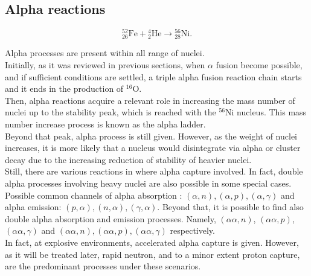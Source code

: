 \documentclass[openany]{book}
\begin{document}
\subsection{Alpha reactions} \label{sub:alphaProcesses}

\begin{equation}  \label{eq:reaction_52Fealpha}
	\mathrm{{}^{52}_{26}Fe +{}^{4}_{2}He \rightarrow {}^{56}_{28}Ni}.
\end{equation}

Alpha processes are present within all range of nuclei. \\

Initially, as it was reviewed in previous sections, when $\alpha$ fusion become possible, and if sufficient conditions are settled, a triple alpha fusion reaction chain starts and it ends in the production of $\mathrm{{}^{16}O}$.  \\

Then, alpha reactions acquire a relevant role in increasing the mass number of nuclei up to the stability peak, which is reached with the $\mathrm{{}^{56}Ni}$ nucleus. This mass number increase process is known as the alpha ladder.  \\

Beyond that peak, alpha process is still given. However, as the weight of nuclei increases, it is more likely that a nucleus would disintegrate via alpha or cluster decay  due to the increasing reduction of stability of heavier nuclei.  \\

Still, there are various reactions in where alpha capture involved. In fact, double alpha processes involving heavy nuclei are also possible in some special cases. \\

Possible common channels of alpha absorption :
$(\alpha, n), (\alpha, p), (\alpha, \gamma)$ and alpha emission: $(p, \alpha), (n, \alpha),  (\gamma, \alpha)$. Beyond that, it is possible to find also double alpha absorption and emission processes. Namely, $(\alpha \alpha, n)$, $(\alpha \alpha, p)$, $(\alpha \alpha, \gamma)$ and $(\alpha \alpha, n), (\alpha \alpha, p), (\alpha \alpha, \gamma)$ respectively. \\

In fact, at explosive environments, accelerated alpha capture is given. However, as it will be treated later, rapid neutron, and to a minor extent proton capture, are the predominant processes under these scenarios. \\  
\end{document}
